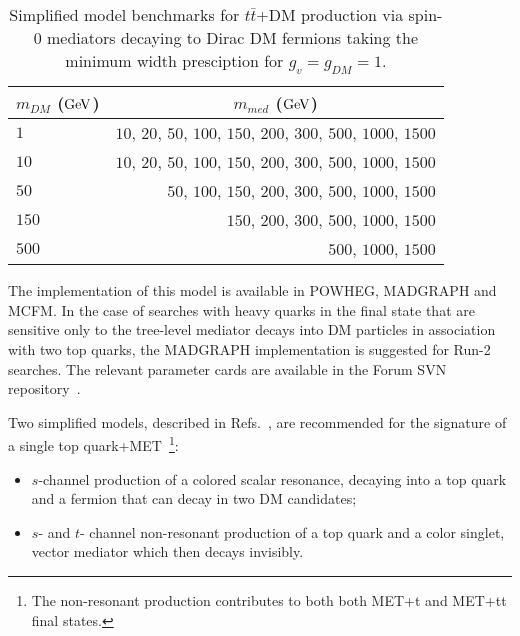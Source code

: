\documentclass[a4,debug,notitlepage,nobib]{tufte-handout}
\newif\ifATLAS
\newif\ifCMS
\begin{document}
\begin{table}[!ht]
\centering
\begin{tabular}{| l | r |}
\hline
\multicolumn{1}{|c|}{$m_{DM}$ (${\rm GeV}$)} & \multicolumn{1}{c|}{$m_{med}$ (${\rm GeV}$)} \\
\hline
 $1$    & $10$, $20$, $50$, $100$, $150$, $200$, $300$, $500$, $1000$, $1500$  \\
 $10$   & $10$, $20$, $50$, $100$, $150$, $200$, $300$, $500$, $1000$, $1500$  \\
 $50$   &             $50$, $100$, $150$, $200$, $300$, $500$, $1000$, $1500$  \\
 $150$  &                          $150$, $200$, $300$, $500$, $1000$, $1500$  \\
 $500$  &                                               $500$, $1000$, $1500$  \\
\hline
\end{tabular}
\caption{Simplified model benchmarks for $t\bar{t}$+DM production via spin-0 mediators decaying to Dirac DM fermions taking the minimum width presciption for $g_v = g_{DM} = 1$.}
\label{tab:ttdm_benchmarks}
\end{table}

The implementation of this model is available in POWHEG, MADGRAPH
and MCFM. In the case of searches with heavy quarks in the final state
that are sensitive only to the tree-level mediator decays into DM particles
in association with two top quarks, the MADGRAPH implementation is suggested
for Run-2 searches. The relevant parameter cards are available in the Forum 
SVN repository~\cite{ForumSVN_DMTTBar}.


\ifATLAS 
The ATLAS implementation of this model using on-the-fly Madgraph
will follow the MC15 pilot request for the monophoton D5 operator~\cite{ATLAS_PowhegPythiaMC15Test}. 
\fi

\ifCMS
\textbf{[Open point: Add here implementation details for CMS..]}
\fi


Two simplified models, described in Refs.~\cite{Andrea:2011ws,Boucheneb:2014wza}, are recommended 
for the signature of a single top quark+MET~\footnote{The non-resonant production 
contributes to both both MET+t and MET+tt final states.}:

\begin{itemize}
\item $s$-channel production of a colored scalar resonance, decaying into a top quark and a fermion
that can decay in two DM candidates;
\item $s$- and $t$- channel non-resonant production of a top quark and a color singlet, vector mediator which then decays invisibly.
\end{itemize}
\end{document}
